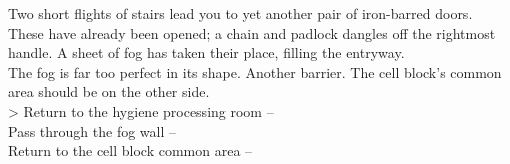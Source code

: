 Two short flights of stairs lead you to yet another pair of iron-barred doors. These have already been opened; a chain and padlock dangles off the rightmost handle. A sheet of fog has taken their place, filling the entryway.\\

The fog is far too perfect in its shape. Another barrier. The cell block’s common area should be on the other side.\\

> Return to the hygiene processing room -- \\
 Pass through the fog wall -- \\
 Return to the cell block common area -- 